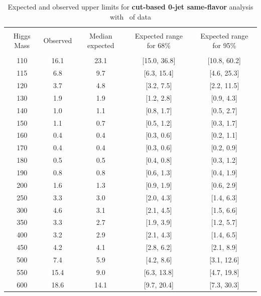 \begin{table}[!hbp]
\begin{center}
\begin{tabular}{c c c c c}
\hline
\vspace{-3mm} && \\
 Higgs Mass   & Observed & Median expected & Expected range for 68\% & Expected range for 95\%   \\
\vspace{-3mm} && \\
\hline
110 & 16.1 & 23.1 & [15.0, 36.8] & [10.8, 60.2] \\
115 & 6.8 & 9.7 & [6.3, 15.4] & [4.6, 25.3] \\
120 & 3.7 & 4.8 & [3.2, 7.5] & [2.2, 11.5] \\
130 & 1.9 & 1.9 & [1.2, 2.8] & [0.9, 4.3] \\
140 & 1.0 & 1.1 & [0.8, 1.7] & [0.5, 2.7] \\
150 & 1.1 & 0.7 & [0.5, 1.2] & [0.3, 1.7] \\
160 & 0.4 & 0.4 & [0.3, 0.6] & [0.2, 1.1] \\
170 & 0.4 & 0.4 & [0.3, 0.6] & [0.2, 0.9] \\
180 & 0.5 & 0.5 & [0.4, 0.8] & [0.3, 1.2] \\
190 & 0.8 & 0.8 & [0.6, 1.3] & [0.4, 1.9] \\
200 & 1.6 & 1.3 & [0.9, 1.9] & [0.6, 2.9] \\
250 & 3.3 & 3.0 & [2.0, 4.3] & [1.4, 6.3] \\
300 & 4.6 & 3.1 & [2.1, 4.5] & [1.5, 6.6] \\
350 & 3.3 & 2.7 & [1.9, 3.9] & [1.2, 5.7] \\
400 & 3.2 & 2.9 & [2.1, 4.3] & [1.4, 6.5] \\
450 & 4.2 & 4.1 & [2.8, 6.2] & [2.1, 8.9] \\
500 & 7.4 & 5.9 & [4.2, 8.6] & [3.1, 12.6] \\
550 & 15.4 & 9.0 & [6.3, 13.8] & [4.7, 19.8] \\
600 & 18.6 & 14.1 & [9.7, 20.4] & [7.3, 30.3] \\
\hline
\end{tabular}
\caption{Expected and observed upper limits for {\bf cut-based 0-jet
    same-flavor} analysis with \intlumi\ of data}
\label{tab:sf0_cut}
\end{center}
\end{table}

